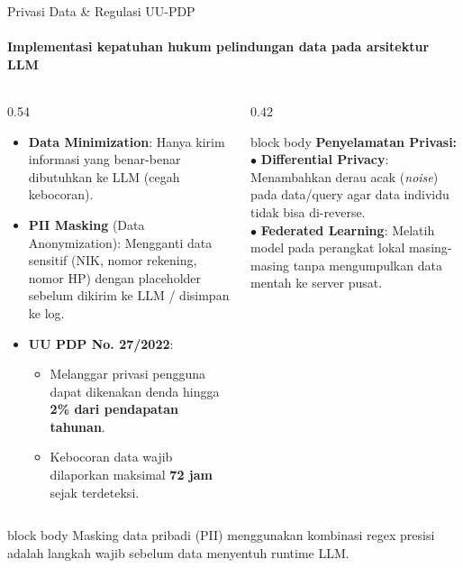 \documentclass[aspectratio=169,t]{beamer}
\newcommand{\takeaway}[1]{%
  \vspace{0.1em}
  \begin{beamercolorbox}[rounded=true,shadow=false,sep=5pt]{block body}
    \centering\footnotesize\color{nvlightgreen}#1
  \end{beamercolorbox}%
}
\begin{document}
\begin{frame}{Privasi Data \& Regulasi UU-PDP}
  \framesubtitle{Implementasi kepatuhan hukum pelindungan data pada arsitektur LLM}
  \begin{columns}[T]
    \begin{column}{0.54\textwidth}
      \begin{itemize}\scriptsize
        \item \textbf{Data Minimization}: Hanya kirim informasi yang benar-benar dibutuhkan ke LLM (cegah kebocoran).
        \item \textbf{PII Masking} (Data Anonymization): Mengganti data sensitif (NIK, nomor rekening, nomor HP) dengan placeholder sebelum dikirim ke LLM / disimpan ke log.
        \item \textbf{UU PDP No. 27/2022}:
          \begin{itemize}\scriptsize
            \item Melanggar privasi pengguna dapat dikenakan denda hingga \textbf{2\% dari pendapatan tahunan}.
            \item Kebocoran data wajib dilaporkan maksimal \textbf{72 jam} sejak terdeteksi.
          \end{itemize}
      \end{itemize}
    \end{column}
    \begin{column}{0.42\textwidth}
      \begin{center}
      \begin{beamercolorbox}[rounded=true,shadow=false,sep=5pt]{block body}
        {\footnotesize\color{nvblue}\textbf{Penyelamatan Privasi:}}
        \vspace{0.1em}
        {\scriptsize\color{nvwhite}
        $\bullet$ \textbf{Differential Privacy}: Menambahkan derau acak (\emph{noise}) pada data/query agar data individu tidak bisa di-reverse.\\
        $\bullet$ \textbf{Federated Learning}: Melatih model pada perangkat lokal masing-masing tanpa mengumpulkan data mentah ke server pusat.}
      \end{beamercolorbox}
      \end{center}
    \end{column}
  \end{columns}
  \takeaway{Masking data pribadi (PII) menggunakan kombinasi regex presisi adalah langkah wajib sebelum data menyentuh runtime LLM.}
\end{frame}
\end{document}
